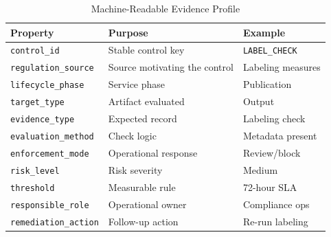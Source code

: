 \begin{table}[H]
\centering
\caption{Machine-Readable Evidence Profile}
\label{tab:evidence-profile}
\scriptsize
\begin{tabularx}{\columnwidth}{@{}p{} X p{}@{}}
\toprule
Property & Purpose & Example \\
\midrule
\texttt{control\_id} & Stable control key & \texttt{LABEL\_CHECK} \\
\texttt{regulation\_source} & Source motivating the control & Labeling measures \\
\texttt{lifecycle\_phase} & Service phase & Publication \\
\texttt{target\_type} & Artifact evaluated & Output \\
\texttt{evidence\_type} & Expected record & Labeling check \\
\texttt{evaluation\_method} & Check logic & Metadata present \\
\texttt{enforcement\_mode} & Operational response & Review/block \\
\texttt{risk\_level} & Risk severity & Medium \\
\texttt{threshold} & Measurable rule & 72-hour SLA \\
\texttt{responsible\_role} & Operational owner & Compliance ops \\
\texttt{remediation\_action} & Follow-up action & Re-run labeling \\
\bottomrule
\end{tabularx}
\end{table}
